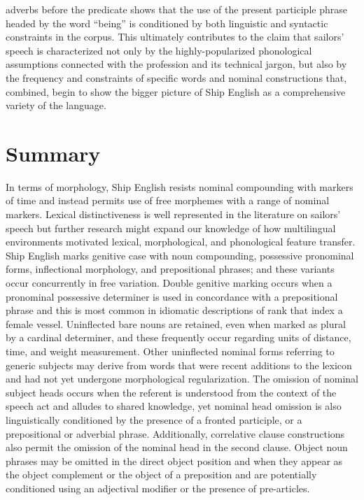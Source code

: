 adverbs before the predicate shows that the use of the present participle phrase headed by the word “being” is conditioned by both linguistic and syntactic constraints in the corpus. This ultimately contributes to the claim that sailors’ speech is characterized not only by the highly-popularized phonological assumptions connected with the profession and its technical jargon, but also by the frequency and constraints of specific words and nominal constructions that, combined, begin to show the bigger picture of Ship English as a comprehensive variety of the language.  

\section{{Summary} }%

In terms of morphology, Ship English resists nominal compounding with markers of time and instead permits use of free morphemes with a range of nominal markers. Lexical distinctiveness is well represented in the literature on sailors’ speech but further research might expand our knowledge of how multilingual environments motivated lexical, morphological, and phonological feature transfer. Ship English marks genitive case with noun compounding, possessive pronominal forms, inflectional morphology, and prepositional phrases; and these variants occur concurrently in free variation. Double genitive marking occurs when a pronominal possessive determiner is used in concordance with a prepositional phrase and this is most common in idiomatic descriptions of rank that index a female vessel. Uninflected bare nouns are retained, even when marked as plural by a cardinal determiner, and these frequently occur regarding units of distance, time, and weight measurement. Other uninflected nominal forms referring to generic subjects may derive from words that were recent additions to the lexicon and had not yet undergone morphological regularization. The omission of nominal subject heads occurs when the referent is understood from the context of the speech act and alludes to shared knowledge, yet nominal head omission is also linguistically conditioned by the presence of a fronted participle, or a prepositional or adverbial phrase. Additionally, correlative clause constructions also permit the omission of the nominal head in the second clause. Object noun phrases may be omitted in the direct object position and when they appear as the object complement or the object of a preposition and are potentially conditioned using an adjectival modifier or the presence of pre-articles.

